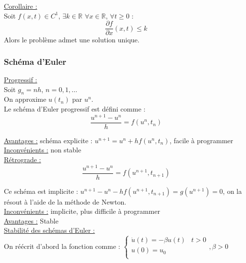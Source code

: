 \documentclass[../main.tex]{subfiles}
\begin{document}
\quad \underline{Corollaire :}\\
Soit $f(x,t) \in C^1$, $\exists k \in \mathbb{R}$ $\forall x \in \mathbb{R}$, $\forall t \geq 0$ : \\
\begin{equation}
    \frac{\partial f}{\partial x}(x,t) \leq k
\end{equation}
Alors le problème admet une solution unique.\\

\subsubsection{Schéma d'Euler}
\quad \underline{Progressif :}\\
Soit $g_n = nh$, $n=0,1,\dots$\\

On approxime $u(t_n)$ par $u^n$.\\

Le schéma d'Euler progressif est défini comme : \\
\begin{equation}
    \frac{u^{n+1}-u^n}{h} = f(u^n, t_n)
\end{equation}

\underline{Avantages :} schéma explicite : $u^{n+1} = u^n + h f(u^n,t_n)$, facile à programmer\\

\underline{Inconvénients :} non stable\\

\quad \underline{Rétrograde :}\\
\begin{equation}
    \frac{u^{n+1}-u^n}{h} = f(u^{n+1},t_{n+1})
\end{equation}

Ce schéma est implicite : $u^{n+1} - u^n - hf(u^{n+1}, t_{n+1}) = g(u^{n+1}) = 0$, on la résout à l'aide de la méthode de Newton.\\

\underline{Inconvénients :} implicite, plus difficile à programmer\\
\underline{Avantages :} Stable\\

\quad \underline{Stabilité des schémas d'Euler :}\\
On réécrit d'abord la fonction comme : $\begin{cases}
    \dot{u}(t) = -\beta u(t) & t>0\\
    u(0) = u_0 & \\
\end{cases}, \beta>0$\\
\end{document}
